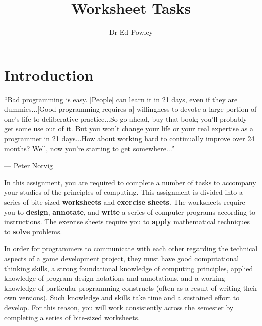 \documentclass{../../fal_assignment}
\title{Worksheet Tasks}
\author{Dr Ed Powley}
\begin{document}
\maketitle

\section*{Introduction}

\begin{marginquote}
``Bad programming is easy. [People] can learn it in 21 days, even if they are dummies...[Good programming requires a] willingness to devote a large portion of one's life to deliberative practice...So go ahead, buy that book; you'll probably get some use out of it. But you won't change your life or your real expertise as a programmer in 21 days...How about working hard to continually improve over 24 months? Well, now you're starting to get somewhere...''
\par --- Peter Norvig
\end{marginquote}

In this assignment, you are required to complete a number of tasks to accompany your studies of the principles of computing. This assignment is divided into a series of bite-sized \textbf{worksheets} and \textbf{exercise sheets}. The worksheets require you to \textbf{design}, \textbf{annotate}, and \textbf{write} a series of computer programs according to instructions. The exercise sheets require you to \textbf{apply} mathematical techniques to \textbf{solve} problems.

In order for programmers to communicate with each other regarding the technical aspects of a game development project, they must have good computational thinking skills, a strong foundational knowledge of computing principles, applied knowledge of program design notations and annotations, and a working knowledge of particular programming constructs (often as a result of writing their own versions). Such knowledge and skills take time and a sustained effort to develop. For this reason, you will work consistently across the semester by completing a series of bite-sized worksheets.
\end{document}
